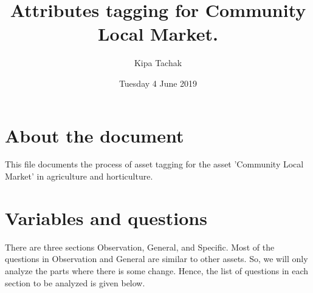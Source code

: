 \documentclass[oneside,twocolumn]{article}
\title{Attributes tagging for Community Local Market.}
\author{Kipa Tachak}
\date{Tuesday  4 June 2019}
\begin{document}
\maketitle


\section{About the document}
This file documents the process of asset tagging for the asset
'Community Local Market' in agriculture and horticulture.

\section{Variables and questions}
There are three sections Observation, General, and Specific. Most of
the questions in Observation and General are similar to other
assets. So, we will only analyze the parts where there is some
change. Hence, the list of questions in each section to be
analyzed is given below.
\end{document}
